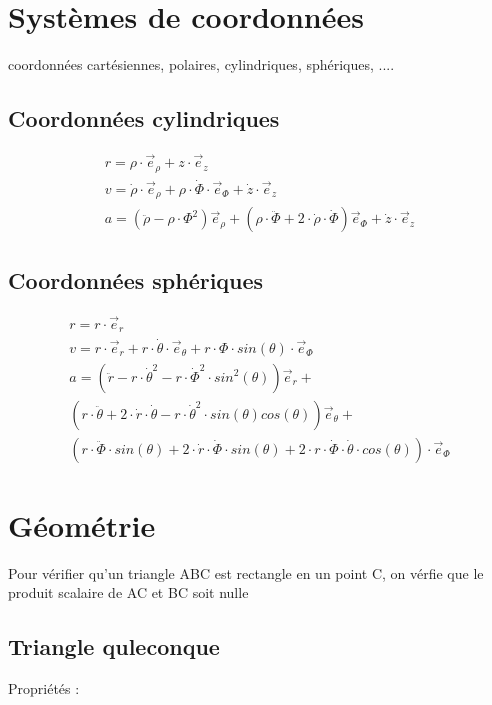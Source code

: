 \newpage
\section{Systèmes de coordonnées}
coordonnées cartésiennes, polaires, cylindriques, sphériques, ....\\
\subsection{Coordonnées cylindriques}
\begin{eqnarray}
r=\rho \cdot \vec{e}_{\rho}+z \cdot \vec{e}_z\\
v=\dot{\rho} \cdot \vec{e}_{\rho} + \rho \cdot \dot{\Phi}\cdot \vec{e}_{\Phi}+\dot{z}\cdot \vec{e}_z\\
a=(\ddot{\rho}-\rho \cdot \Phi^2)\vec{e}_{\rho}+(\rho \cdot \ddot{\Phi}+2 \cdot \dot{\rho}\cdot \dot{\Phi})\vec{e}_{\Phi}+\dot{z}\cdot \vec{e}_z
\end{eqnarray}

\subsection{Coordonnées sphériques}

\begin{eqnarray}
r=r \cdot \vec{e}_r\\
v=r \cdot \vec{e}_{r} + r \cdot \dot{\theta}\cdot \vec{e}_{\theta}+r \cdot \Phi\cdot sin(\theta) \cdot \vec{e}_{\Phi}\\
a=(\ddot{r}-r \cdot \dot{\theta}^2-r\cdot \dot{\Phi}^2 \cdot sin^2(\theta))\vec{e}_{r}+\\
(r \cdot \ddot{\theta}+2 \cdot \dot{r}\cdot \dot{\theta}-r\cdot \dot{\theta}^2 \cdot sin(\theta)cos(\theta))\vec{e}_{\theta}+\\
(r \cdot \ddot{\Phi} \cdot sin(\theta)+2 \cdot \dot{r} \cdot \dot{\Phi} \cdot sin(\theta)+2 \cdot r \cdot \dot{\Phi} \cdot \dot{\theta} \cdot cos(\theta))\cdot \vec{e}_{\Phi}
\end{eqnarray}

\newpage
\section{Géométrie}

Pour vérifier qu'un triangle ABC est rectangle en un point C, on vérfie que le produit scalaire de AC et BC soit nulle


\subsection{Triangle quleconque}
Propriétés : \\



